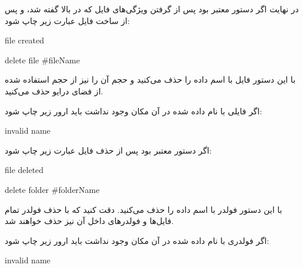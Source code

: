 \documentclass[]{article}
\begin{document}
در نهایت اگر دستور معتبر بود پس از گرفتن ویژگی‌های فایل که در بالا گفته شد، و پس از ساخت فایل عبارت زیر چاپ شود:

 \begin{tcolorbox}[boxrule=0pt]
	\begin{latin}
  	  \large{
  	file created
		}
	\end{latin}
\end{tcolorbox}


\begin{tcolorbox}[boxrule=0pt]
	\begin{latin}
  	  \large{
  	delete file \#fileName
		}
	\end{latin}
\end{tcolorbox}


با این دستور فایل با اسم داده را حذف می‌کنید و حجم آن را نیز از حجم استفاده شده از فضای درایو حذف می‌کنید.

اگر فایلی با نام داده شده در آن مکان وجود نداشت باید ارور زیر چاپ شود:

\begin{tcolorbox}[boxrule=0pt]
	\begin{latin}
  	  \large{
  	invalid name
		}
	\end{latin}
\end{tcolorbox}


اگر دستور معتبر بود پس از حذف فایل عبارت زیر چاپ شود:

\begin{tcolorbox}[boxrule=0pt]
	\begin{latin}
  	  \large{
  	file deleted
		}
	\end{latin}
\end{tcolorbox}



\begin{tcolorbox}[boxrule=0pt]
	\begin{latin}
  	  \large{
  	delete folder \#folderName
		}
	\end{latin}
\end{tcolorbox}


با این دستور فولدر با اسم داده را حذف می‌کنید. دقت کنید که با حذف فولدر تمام فایل‌ها و فولدرهای داخل آن نیز حذف خواهند شد.

اگر فولدری با نام داده شده در آن مکان وجود نداشت باید ارور زیر چاپ شود:

\begin{tcolorbox}[boxrule=0pt]
	\begin{latin}
  	  \large{
  	invalid name
		}
	\end{latin}
\end{tcolorbox}
\end{document}
